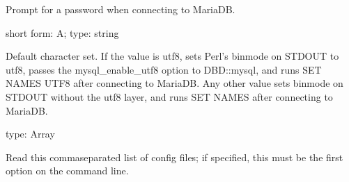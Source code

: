 \documentclass[letterpaper,10pt,english]{sphinxmanual}
\begin{document}
\begin{fulllineitems}
\label{\detokenize{mariadb-kill:cmdoption-mariadb-kill-ask-pass}}
Prompt for a password when connecting to MariaDB.

\end{fulllineitems}


\begin{fulllineitems}
\label{\detokenize{mariadb-kill:cmdoption-mariadb-kill-charset}}
short form: \sphinxhyphen{}A; type: string

Default character set.  If the value is utf8, sets Perl’s binmode on
STDOUT to utf8, passes the mysql\_enable\_utf8 option to DBD::mysql, and runs SET
NAMES UTF8 after connecting to MariaDB.  Any other value sets binmode on STDOUT
without the utf8 layer, and runs SET NAMES after connecting to MariaDB.

\end{fulllineitems}


\begin{fulllineitems}
\label{\detokenize{mariadb-kill:cmdoption-mariadb-kill-config}}
type: Array

Read this comma\sphinxhyphen{}separated list of config files; if specified, this must be the
first option on the command line.

\end{fulllineitems}
\end{document}
